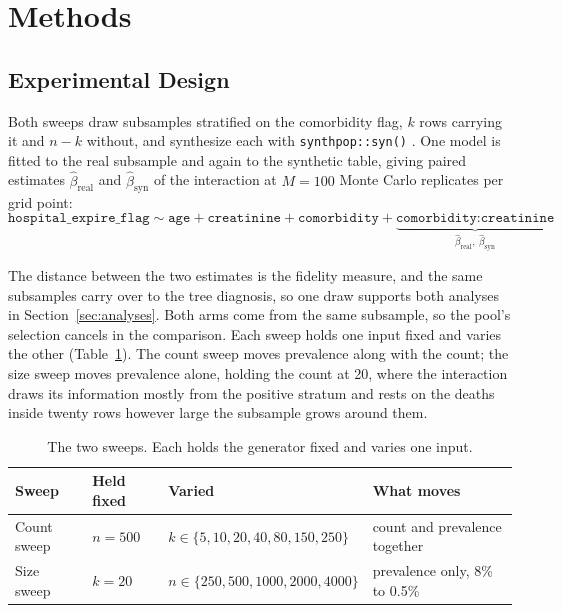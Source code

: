 \documentclass[11pt]{article}
\begin{document}
\section{Methods}

\subsection{Experimental Design}

Both sweeps draw subsamples stratified on the comorbidity flag, $k$ rows
carrying it and $n - k$ without, and synthesize each with
\texttt{synthpop::syn()} \cite{nowok2016}. One model is fitted to the real
subsample and again to the synthetic table, giving paired estimates
$\hat\beta_{\text{real}}$ and $\hat\beta_{\text{syn}}$ of the interaction at
$M = 100$ Monte Carlo replicates per grid point:
\[
\texttt{hospital\_expire\_flag} \sim \texttt{age} + \texttt{creatinine}
  + \texttt{comorbidity}
  + \underbrace{\texttt{comorbidity}{:}\texttt{creatinine}}_{\hat\beta_{\text{real}},\ \hat\beta_{\text{syn}}}
\]

The distance between the two estimates is the fidelity measure, and the same
subsamples carry over to the tree diagnosis, so one draw supports both analyses
in Section~\ref{sec:analyses}. Both arms come from the same subsample, so the pool's
selection cancels in the comparison. Each sweep holds one input fixed and varies the other (Table~\ref{tab:design}).
The count sweep moves prevalence along with the count; the size sweep moves
prevalence alone, holding the count at 20, where the interaction draws its
information mostly from the positive stratum and rests on the deaths inside
twenty rows however large the subsample grows around them.

\begin{table}[H]
\centering
\begin{tabular}{llll}
\toprule
Sweep & Held fixed & Varied & What moves \\
\midrule
Count sweep    & $n = 500$ & $k \in \{5, 10, 20, 40, 80, 150, 250\}$
                  & count and prevalence together \\
Size sweep     & $k = 20$  & $n \in \{250, 500, 1000, 2000, 4000\}$
                  & prevalence only, 8\% to 0.5\% \\
\bottomrule
\end{tabular}
\caption{The two sweeps. Each holds the generator fixed and varies one input.}
\label{tab:design}
\end{table}
\end{document}
